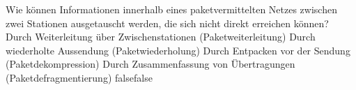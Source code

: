     {Wie können Informationen innerhalb eines paketvermittelten Netzes zwischen zwei Stationen ausgetauscht werden, die sich nicht direkt erreichen können?}
    {Durch Weiterleitung über Zwischenstationen (Paketweiterleitung)}
    {Durch wiederholte Aussendung (Paketwiederholung)}
    {Durch Entpacken vor der Sendung (Paketdekompression)}
    {Durch Zusammenfassung von Übertragungen (Paketdefragmentierung)}
    {false}{false}